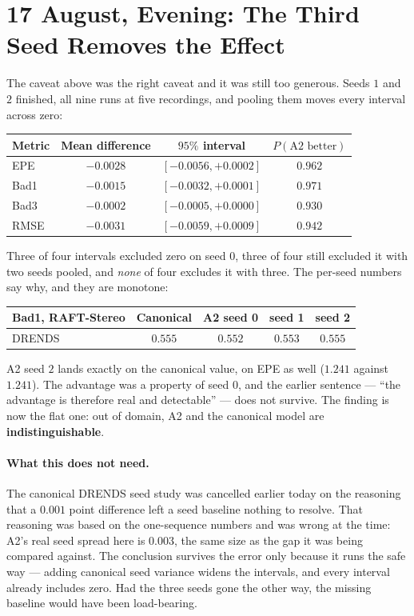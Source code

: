 \documentclass[11pt,a4paper]{article}
\begin{document}
\section*{17 August, Evening: The Third Seed Removes the Effect}

The caveat above was the right caveat and it was still too generous. Seeds
$1$ and $2$ finished, all nine runs at five recordings, and pooling them
moves every interval across zero:

\begin{center}
\begin{tabular}{lccc}
\toprule
Metric & Mean difference & $95\%$ interval & $P(\text{A2 better})$ \\
\midrule
EPE  & $-0.0028$ & $[-0.0056, +0.0002]$ & $0.962$ \\
Bad1 & $-0.0015$ & $[-0.0032, +0.0001]$ & $0.971$ \\
Bad3 & $-0.0002$ & $[-0.0005, +0.0000]$ & $0.930$ \\
RMSE & $-0.0031$ & $[-0.0059, +0.0009]$ & $0.942$ \\
\bottomrule
\end{tabular}
\end{center}

Three of four intervals excluded zero on seed $0$, three of four still
excluded it with two seeds pooled, and \emph{none} of four excludes it
with three. The per-seed numbers say why, and they are monotone:

\begin{center}
\begin{tabular}{lcccc}
\toprule
Bad1, RAFT-Stereo & Canonical & A2 seed 0 & seed 1 & seed 2 \\
\midrule
DRENDS & $0.555$ & $0.552$ & $0.553$ & $0.555$ \\
\bottomrule
\end{tabular}
\end{center}

A2 seed $2$ lands exactly on the canonical value, on EPE as well
($1.241$ against $1.241$). The advantage was a property of seed $0$, and
the earlier sentence --- ``the advantage is therefore real and detectable''
--- does not survive. The finding is now the flat one: out of domain, A2
and the canonical model are \textbf{indistinguishable}.

\paragraph{What this does not need.} The canonical DRENDS seed study was
cancelled earlier today on the reasoning that a $0.001$ point difference
left a seed baseline nothing to resolve. That reasoning was based on the
one-sequence numbers and was wrong at the time: A2's real seed spread here
is $0.003$, the same size as the gap it was being compared against. The
conclusion survives the error only because it runs the safe way --- adding
canonical seed variance widens the intervals, and every interval already
includes zero. Had the three seeds gone the other way, the missing
baseline would have been load-bearing.
\end{document}
